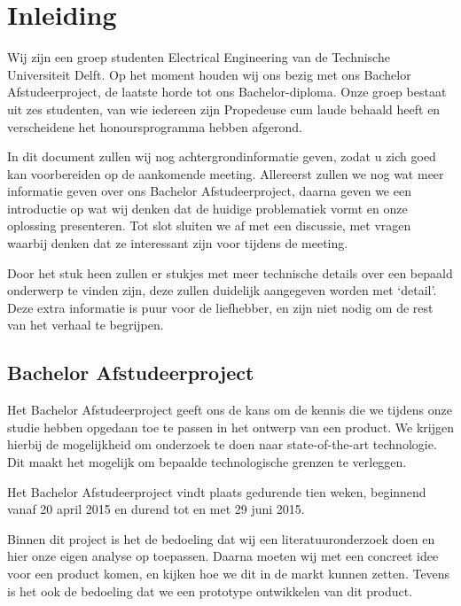 \documentclass[oneside, a4paper, openany]{memoir}
\begin{document}


\frontmatter
\setcounter{page}{5}
\begin{titlingpage}
  \pagestyle{empty}
  \titleGM
\end{titlingpage}

\tableofcontents

\clearpage
\mainmatter

\chapter{Inleiding}
Wij zijn een groep studenten Electrical Engineering van de Technische Universiteit Delft. Op het moment houden wij ons bezig met ons Bachelor Afstudeerproject, de laatste horde tot ons Bachelor-diploma. Onze groep bestaat uit zes studenten, van wie iedereen zijn Propedeuse cum laude behaald heeft en verscheidene het honoursprogramma hebben afgerond.

In dit document zullen wij nog achtergrondinformatie geven, zodat u zich goed kan voorbereiden op de aankomende meeting. Allereerst zullen we nog wat meer informatie geven over ons Bachelor Afstudeerproject, daarna geven we een introductie op wat wij denken dat de huidige problematiek vormt en onze oplossing presenteren. Tot slot sluiten we af met een discussie, met vragen waarbij denken dat ze interessant zijn voor tijdens de meeting.

Door het stuk heen zullen er stukjes met meer technische details over een bepaald onderwerp te vinden zijn, deze zullen duidelijk aangegeven worden met `detail'. Deze extra informatie is puur voor de liefhebber, en zijn niet nodig om de rest van het verhaal te begrijpen.


\section{Bachelor Afstudeerproject}
Het Bachelor Afstudeerproject geeft ons de kans om de kennis die we tijdens onze studie hebben opgedaan toe te passen in het ontwerp van een product. We krijgen hierbij de mogelijkheid om onderzoek te doen naar state-of-the-art technologie. Dit maakt het mogelijk om bepaalde technologische grenzen te verleggen.

Het Bachelor Afstudeerproject vindt plaats gedurende tien weken, beginnend vanaf 20 april 2015 en durend tot en met 29 juni 2015.

Binnen dit project is het de bedoeling dat wij een literatuuronderzoek doen en hier onze eigen analyse op toepassen. Daarna moeten wij met een concreet idee voor een product komen, en kijken hoe we dit in de markt kunnen zetten. Tevens is het ook de bedoeling dat we een prototype ontwikkelen van dit product.
\end{document}
